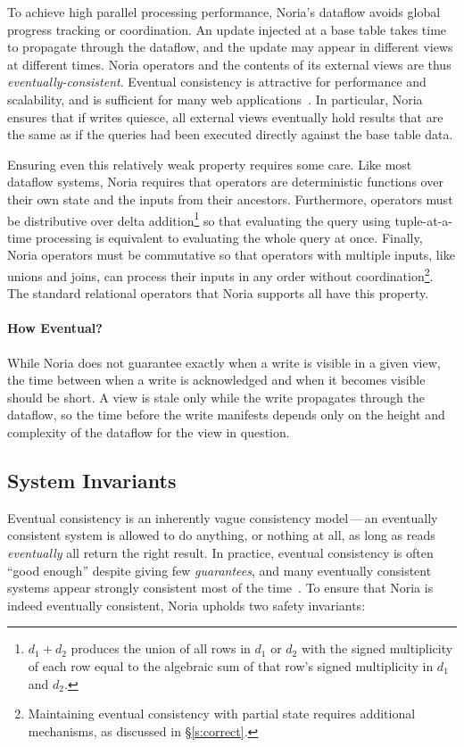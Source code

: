 To achieve high parallel processing performance, Noria's dataflow avoids
global progress tracking or coordination. An update injected at a base table
takes time to propagate through the dataflow, and the update may appear in
different views at different times. Noria operators and the contents of its
external views are thus \emph{eventually-consistent}. Eventual consistency is
attractive for performance and scalability, and is sufficient for many web
applications~\cite{eventually-consistent, facebook-memcache, pnuts}. In
particular, Noria ensures that if writes quiesce, all external views eventually
hold results that are the same as if the queries had been executed directly
against the base table data.

Ensuring even this relatively weak property requires some care. Like most
dataflow systems, Noria requires that operators are deterministic functions over
their own state and the inputs from their ancestors. Furthermore, operators must
be distributive over delta addition\footnote{$d_1 + d_2$ produces the union of
all rows in $d_1$ or $d_2$ with the signed multiplicity of each row equal to the
algebraic sum of that row's signed multiplicity in $d_1$ and $d_2$.} so that
evaluating the query using tuple-at-a-time processing is equivalent to
evaluating the whole query at once. Finally, Noria operators must be commutative
so that operators with multiple inputs, like unions and joins, can process their
inputs in any order without coordination\footnote{Maintaining eventual
consistency with partial state requires additional mechanisms, as discussed in
\S\ref{s:correct}.}. The standard relational operators that Noria supports all
have this property.

\paragraph{How Eventual?}
While Noria does not guarantee exactly when a write is visible in a given view,
the time between when a write is acknowledged and when it becomes visible should
be short. A view is stale only while the write propagates through the dataflow,
so the time before the write manifests depends only on the height and complexity
of the dataflow for the view in question.

\subsection{System Invariants}

Eventual consistency is an inherently vague consistency model\,---\,an
eventually consistent system is allowed to do anything, or nothing at all, as
long as reads \emph{eventually} all return the right result. In practice,
eventual consistency is often ``good enough'' despite giving few
\emph{guarantees}, and many eventually consistent systems appear strongly
consistent most of the time~\cite{eventual}. To ensure that Noria is indeed
eventually consistent, Noria upholds two safety invariants:

